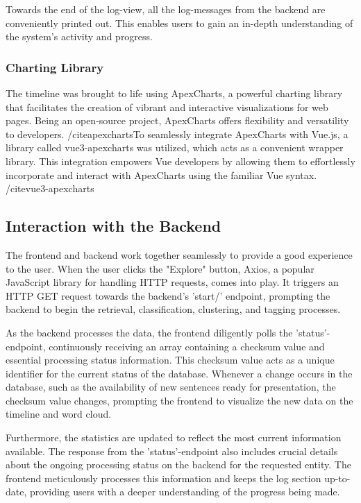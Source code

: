 \documentclass[a4paper,12pt]{report} %
\begin{document}
Towards the end of the log-view, all the log-messages from the backend are conveniently printed out. This enables users to gain an in-depth understanding of the system's activity and progress.

\subsubsection{Charting Library}
The timeline was brought to life using ApexCharts, a powerful charting library that facilitates the creation of vibrant and interactive visualizations for web pages. Being an open-source project, ApexCharts offers flexibility and versatility to developers. /cite{apexcharts}To seamlessly integrate ApexCharts with Vue.js, a library called vue3-apexcharts was utilized, which acts as a convenient wrapper library. This integration empowers Vue developers by allowing them to effortlessly incorporate and interact with ApexCharts using the familiar Vue syntax. /cite{vue3-apexcharts}

\subsection{Interaction with the Backend}
The frontend and backend work together seamlessly to provide a good experience to the user. When the user clicks the "Explore" button, Axios, a popular JavaScript library for handling HTTP requests, comes into play. It triggers an HTTP GET request towards the backend's 'start/' endpoint, prompting the backend to begin the retrieval, classification, clustering, and tagging processes.

As the backend processes the data, the frontend diligently polls the 'status'-endpoint, continuously receiving an array containing a checksum value and essential processing status information. This checksum value acts as a unique identifier for the current status of the database. Whenever a change occurs in the database, such as the availability of new sentences ready for presentation, the checksum value changes, prompting the frontend to visualize the new data on the timeline and word cloud.

Furthermore, the statistics are updated to reflect the most current information available. The response from the 'status'-endpoint also includes crucial details about the ongoing processing status on the backend for the requested entity. The frontend meticulously processes this information and keeps the log section up-to-date, providing users with a deeper understanding of the progress being made.
\end{document}
